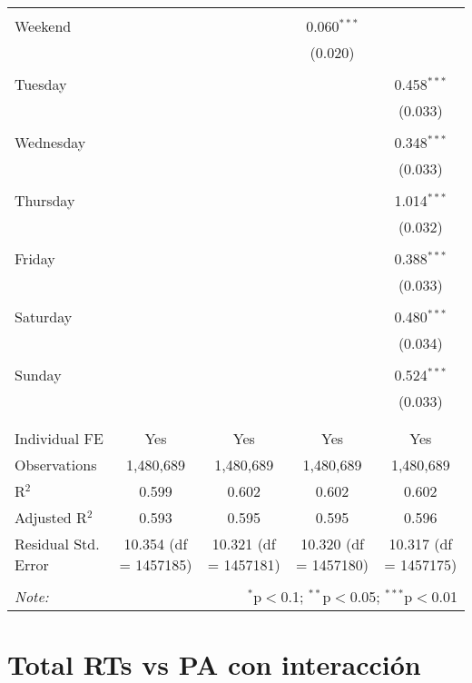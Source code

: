 \documentclass[
]{article}
\begin{document}
\begin{table}[!htbp]
{\begin{tabular}{@{\extracolsep{5pt}}lcccc}
  & & & & \\ 
 Weekend &  &  & 0.060$^{***}$ &  \\ 
  &  &  & (0.020) &  \\ 
  & & & & \\ 
 Tuesday &  &  &  & 0.458$^{***}$ \\ 
  &  &  &  & (0.033) \\ 
  & & & & \\ 
 Wednesday &  &  &  & 0.348$^{***}$ \\ 
  &  &  &  & (0.033) \\ 
  & & & & \\ 
 Thursday &  &  &  & 1.014$^{***}$ \\ 
  &  &  &  & (0.032) \\ 
  & & & & \\ 
 Friday &  &  &  & 0.388$^{***}$ \\ 
  &  &  &  & (0.033) \\ 
  & & & & \\ 
 Saturday &  &  &  & 0.480$^{***}$ \\ 
  &  &  &  & (0.034) \\ 
  & & & & \\ 
 Sunday &  &  &  & 0.524$^{***}$ \\ 
  &  &  &  & (0.033) \\ 
  & & & & \\ 
\hline \\[-1.8ex] 
Individual FE & Yes & Yes & Yes & Yes \\ 
Observations & 1,480,689 & 1,480,689 & 1,480,689 & 1,480,689 \\ 
R$^{2}$ & 0.599 & 0.602 & 0.602 & 0.602 \\ 
Adjusted R$^{2}$ & 0.593 & 0.595 & 0.595 & 0.596 \\ 
Residual Std. Error & 10.354 (df = 1457185) & 10.321 (df = 1457181) & 10.320 (df = 1457180) & 10.317 (df = 1457175) \\ 
\hline 
\hline \\[-1.8ex] 
\textit{Note:}  & \multicolumn{4}{r}{$^{*}$p$<$0.1; $^{**}$p$<$0.05; $^{***}$p$<$0.01} \\ 
\end{tabular}
} 
\end{table} 
\newpage
\section{Total RTs vs PA con interacción}
\end{document}
